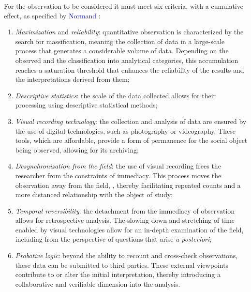 \begin{refsegment}
For the observation to be considered  it must meet six criteria, with a cumulative effect, as specified by \textcolor{blue}{Normand} \textcolor{blue}{\textcite[42-44]{filion_compter_2011}}:
\begin{enumerate}
    \item \textsl{Maximization} and \textsl{reliability}: quantitative observation is characterized by the search for massification, meaning the collection of data in a large-scale process that generates a considerable volume of data. Depending on the  observed and the classification into analytical categories, this accumulation reaches a saturation threshold that enhances the reliability of the results and the interpretations derived from them;
    \item \textsl{Descriptive statistics}: the scale of the data collected allows for their processing using descriptive statistical methods;
    \item \textsl{Visual recording technology}: the collection and analysis of data are ensured by the use of digital technologies, such as photography or videography. These tools, which are affordable, provide a form of permanence for the social object being observed, allowing for its archiving;
    \item \textsl{Desynchronization from the field}: the use of visual recording frees the researcher from the constraints of immediacy. This process moves the observation away from the field, , thereby facilitating repeated counts and a more distanced relationship with the object of study;
    \item \textsl{Temporal reversibility}: the detachment from the immediacy of observation allows for retrospective analysis. The slowing down and stretching of time enabled by visual technologies allow for an in-depth examination of the field, including from the perspective of questions that arise \textsl{a posteriori};
    \item \textsl{Probative logic}: beyond the ability to recount and cross-check observations, these data can be submitted to third parties. These external viewpoints contribute to or alter the initial interpretation, thereby introducing a collaborative and verifiable dimension into the analysis.
\end{enumerate}%


\end{refsegment}
